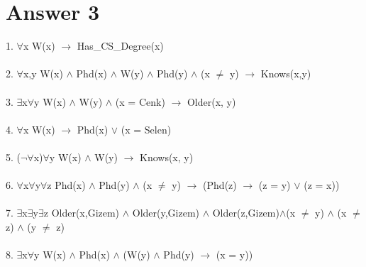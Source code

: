 \documentclass[12pt]{article}
\begin{document}
\section*{Answer 3}
1. $\forall$x W(x) $\rightarrow$ Has\_CS\_Degree(x)\\\\
2. $\forall$x,y W(x) $\land$ Phd(x) $\land$ W(y) $\land$ Phd(y) $\land$ (x $\neq$ y) $\rightarrow$ Knows(x,y)\\\\
3. $\exists$x$\forall$y W(x) $\land$ W(y) $\land$ (x = Cenk) $\rightarrow$ Older(x, y)\\\\
4. $\forall$x W(x) $\rightarrow$ Phd(x) $\lor$ (x = Selen)\\\\
5. ($\neg$$\forall$x)$\forall$y W(x) $\land$ W(y) $\rightarrow$ Knows(x, y)\\\\
6. $\forall$x$\forall$y$\forall$z Phd(x) $\land$ Phd(y) $\land$ (x $\neq$ y) $\rightarrow$ (Phd(z) $\rightarrow$ (z = y) $\lor$ (z = x))\\\\
7. $\exists$x$\exists$y$\exists$z Older(x,Gizem) $\land$ Older(y,Gizem) $\land$ Older(z,Gizem)$\land$(x $\neq$ y) $\land$ (x $\neq$ z) $\land$ (y $\neq$ z)\\\\
8. $\exists$x$\forall$y W(x) $\land$ Phd(x) $\land$ (W(y) $\land$ Phd(y) $\rightarrow$ (x = y))
\end{document}
